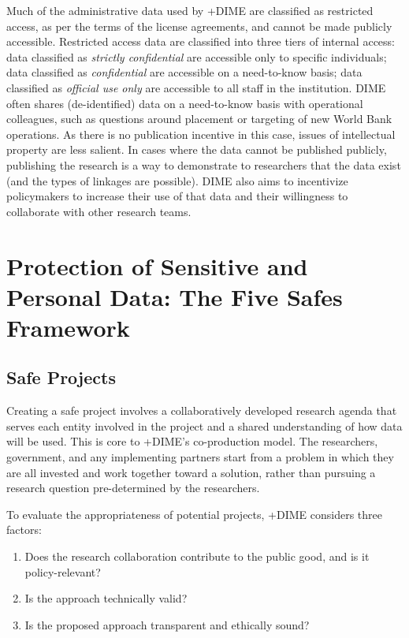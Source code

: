 \documentclass[
]{book}
\providecommand{\tightlist}{%
  \setlength{\itemsep}{0pt}\setlength{\parskip}{0pt}}
\begin{document}
Much of the administrative data used by +DIME\textbar{} are classified as restricted access, as per the terms of the license agreements, and cannot be made publicly accessible. Restricted access data are classified into three tiers of internal access: data classified as \emph{strictly confidential} are accessible only to specific individuals; data classified as \emph{confidential} are accessible on a need-to-know basis; data classified as \emph{official use only} are accessible to all staff in the institution. DIME often shares (de-identified) data on a need-to-know basis with operational colleagues, such as questions around placement or targeting of new World Bank operations. As there is no publication incentive in this case, issues of intellectual property are less salient. In cases where the data cannot be published publicly, publishing the research is a way to demonstrate to researchers that the data exist (and the types of linkages are possible). DIME also aims to incentivize policymakers to increase their use of that data and their willingness to collaborate with other research teams.

\hypertarget{protection-of-sensitive-and-personal-data-the-five-safes-framework-7}{%
\section{Protection of Sensitive and Personal Data: The Five Safes Framework}\label{protection-of-sensitive-and-personal-data-the-five-safes-framework-7}}

\hypertarget{safe-projects-7}{%
\subsection{Safe Projects}\label{safe-projects-7}}

Creating a safe project involves a collaboratively developed research agenda that serves each entity involved in the project and a shared understanding of how data will be used. This is core to +DIME\textbar's co-production model. The researchers, government, and any implementing partners start from a problem in which they are all invested and work together toward a solution, rather than pursuing a research question pre-determined by the researchers.

To evaluate the appropriateness of potential projects, +DIME\textbar{} considers three factors:

\begin{enumerate}
\def\labelenumi{(\arabic{enumi})}
\tightlist
\item
  Does the research collaboration contribute to the public good, and is it policy-relevant?
\item
  Is the approach technically valid?
\item
  Is the proposed approach transparent and ethically sound?
\end{enumerate}
\end{document}
